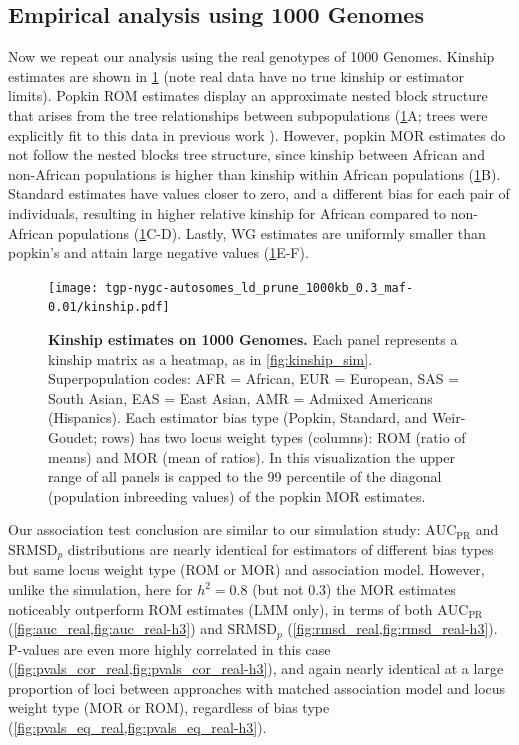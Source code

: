 \documentclass[11pt]{article}
\newcommand{\rmsd}{\text{SRMSD}_p}
\newcommand{\auc}{\text{AUC}_\text{PR}}
\begin{document}
\begin{linenumbers}
\subsection{Empirical analysis using 1000 Genomes}

Now we repeat our analysis using the real genotypes of 1000 Genomes.
Kinship estimates are shown in \cref{fig:kinship_real} (note real data have no true kinship or estimator limits).
Popkin ROM estimates display an approximate nested block structure that arises from the tree relationships between subpopulations (\cref{fig:kinship_real}A; trees were explicitly fit to this data in previous work \citep{yao_limitations_2022}).
However, popkin MOR estimates do not follow the nested blocks tree structure, since kinship between African and non-African populations is higher than kinship within African populations (\cref{fig:kinship_real}B).
Standard estimates have values closer to zero, and a different bias for each pair of individuals, resulting in higher relative kinship for African compared to non-African populations (\cref{fig:kinship_real}C-D).
Lastly, WG estimates are uniformly smaller than popkin's and attain large negative values (\cref{fig:kinship_real}E-F).

\begin{figure}[bp!]
  \centering
  \texttt{[image: tgp-nygc-autosomes\_ld\_prune\_1000kb\_0.3\_maf-0.01/kinship.pdf]}
  \caption{
    {\bf Kinship estimates on 1000 Genomes.}
    Each panel represents a kinship matrix as a heatmap, as in \cref{fig:kinship_sim}.
    Superpopulation codes: AFR = African, EUR = European, SAS = South Asian, EAS = East Asian, AMR = Admixed Americans (Hispanics).
    Each estimator bias type (Popkin, Standard, and Weir-Goudet; rows) has two locus weight types (columns): ROM (ratio of means) and MOR (mean of ratios).
    In this visualization the upper range of all panels is capped to the 99 percentile of the diagonal (population inbreeding values) of the popkin MOR estimates.
  }
  \label{fig:kinship_real}
\end{figure}

Our association test conclusion are similar to our simulation study: $\auc$ and $\rmsd$ distributions are nearly identical for estimators of different bias types but same locus weight type (ROM or MOR) and association model.
However, unlike the simulation, here for $h^2=0.8$ (but not 0.3) the MOR estimates noticeably outperform ROM estimates (LMM only), in terms of both $\auc$ (\cref{fig:auc_real,fig:auc_real-h3}) and $\rmsd$ (\cref{fig:rmsd_real,fig:rmsd_real-h3}).
P-values are even more highly correlated in this case (\cref{fig:pvals_cor_real,fig:pvals_cor_real-h3}), and again nearly identical at a large proportion of loci between approaches with matched association model and locus weight type (MOR or ROM), regardless of bias type (\cref{fig:pvals_eq_real,fig:pvals_eq_real-h3}).


\end{linenumbers}
\end{document}
